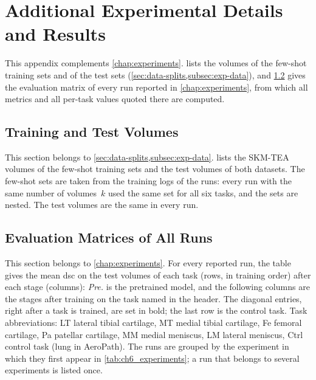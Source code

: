 
\chapter{Additional Experimental Details and Results}
\label{app:results}

This appendix complements \cref{chap:experiments}.
 lists the volumes of the few-shot training sets and of the test sets (\cref{sec:data-splits,subsec:exp-data}), and \cref{sec:app-matrices} gives the evaluation matrix of every run reported in \cref{chap:experiments}, from which all metrics and all per-task values quoted there are computed.

\section{Training and Test Volumes}
\label{sec:app-volumes}

This section belongs to \cref{sec:data-splits,subsec:exp-data}.
 lists the SKM-TEA volumes of the few-shot training sets and the test volumes of both datasets.
The few-shot sets are taken from the training logs of the runs: every run with the same number of volumes~$k$ used the same set for all six tasks, and the sets are nested.
The test volumes are the same in every run.

\begin{table}[tb]
\centering
\caption[Few-shot training volumes and test volumes]{Few-shot training volumes and test volumes. SKM-TEA volumes by their identifier, AeroPath volumes by their number. The full training split contains 108 SKM-TEA volumes (\cref{sec:data-splits}).}
\label{tab:app-volumes}

\end{table}

\section{Evaluation Matrices of All Runs}
\label{sec:app-matrices}

This section belongs to \cref{chap:experiments}.
For every reported run, the table gives the mean \gls{dsc} on the test volumes of each task (rows, in training order) after each stage (columns): \emph{Pre.} is the pretrained model, and the following columns are the stages after training on the task named in the header.
The diagonal entries, right after a task is trained, are set in bold; the last row is the control task.
Task abbreviations: LT lateral tibial cartilage, MT medial tibial cartilage, Fe femoral cartilage, Pa patellar cartilage, MM medial meniscus, LM lateral meniscus, Ctrl control task (lung in AeroPath).
The runs are grouped by the experiment in which they first appear in \cref{tab:ch6_experiments}; a run that belongs to several experiments is listed once.


